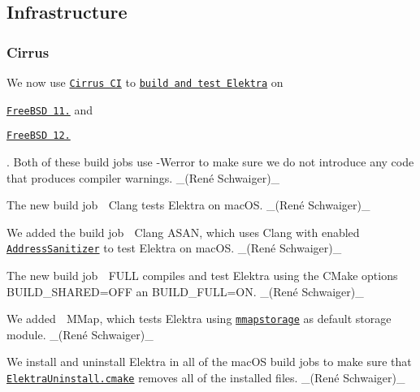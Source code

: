 \subsection*{Infrastructure}

\subsubsection*{Cirrus}


\begin{DoxyItemize}
\item We now use \href{https://cirrus-ci.com}{\tt Cirrus CI} to \href{http://cirrus-ci.com/github/ElektraInitiative/libelektra}{\tt build and test Elektra} on
\begin{DoxyItemize}
\item \href{https://www.freebsd.org/releases/11.2R/announce.html}{\tt Free\+B\+SD 11.} and
\item \href{https://www.freebsd.org/releases/12.0R/announce.html}{\tt Free\+B\+SD 12.}
\end{DoxyItemize}

. Both of these build jobs use {\ttfamily -\/\+Werror} to make sure we do not introduce any code that produces compiler warnings. \+\_\+(René Schwaiger)\+\_\+
\item The new build job {\ttfamily 🍎 Clang} tests Elektra on mac\+OS. \+\_\+(René Schwaiger)\+\_\+
\item We added the build job {\ttfamily 🍎 Clang A\+S\+AN}, which uses Clang with enabled \href{https://en.wikipedia.org/wiki/AddressSanitizer}{\tt Address\+Sanitizer} to test Elektra on mac\+OS. \+\_\+(René Schwaiger)\+\_\+
\item The new build job {\ttfamily 🍎 F\+U\+LL} compiles and test Elektra using the C\+Make options {\ttfamily B\+U\+I\+L\+D\+\_\+\+S\+H\+A\+R\+ED=O\+FF} an {\ttfamily B\+U\+I\+L\+D\+\_\+\+F\+U\+LL=ON}. \+\_\+(René Schwaiger)\+\_\+
\item We added {\ttfamily 🍎 M\+Map}, which tests Elektra using \href{https://www.libelektra.org/plugins/mmapstorage}{\tt {\ttfamily mmapstorage}} as default storage module. \+\_\+(René Schwaiger)\+\_\+
\item We install and uninstall Elektra in all of the mac\+OS build jobs to make sure that \href{https://master.libelektra.org/cmake/ElektraUninstall.cmake}{\tt {\ttfamily Elektra\+Uninstall.\+cmake}} removes all of the installed files. \+\_\+(René Schwaiger)\+\_\+
\end{DoxyItemize}

